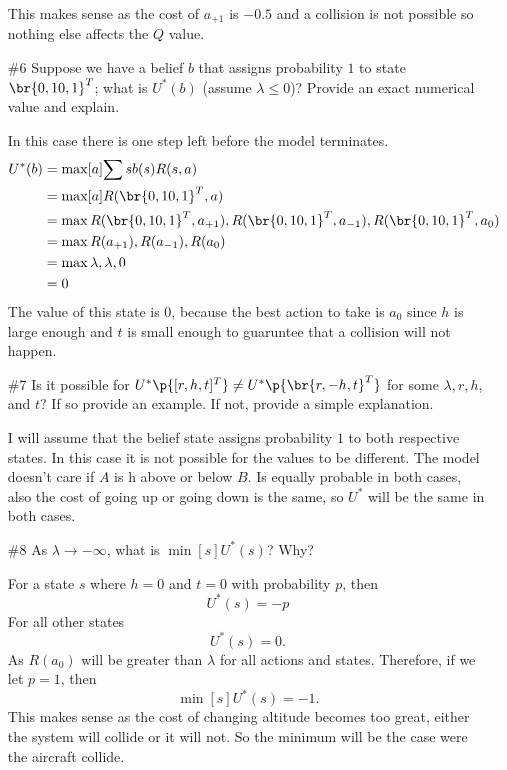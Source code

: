 \documentclass[12pt, oneside]{article}
\begin{document}
\begin{enumerate}
    This makes sense as the cost of $a_{+1}$ is $-0.5$ and a collision is not
    possible so nothing else affects the $Q$ value.

  \item[\#6]
    Suppose we have a belief $b$ that assigns probability $1$ to state
    $\br{0, 10, 1}^T$; what is $U^*(b)$ (assume $\lambda \le 0$)?
    Provide an exact numerical value and explain.

    In this case there is one step left before the model terminates.
    \begin{align*}
      U^*(b) &= \max[a]{\sum{s}{}{b(s)R(s, a)}} \\
      &= \max[a]{R(\br{0, 10, 1}^T, a)} \\
      &= \max{R(\br{0, 10, 1}^T, a_{+1}),R(\br{0, 10, 1}^T, a_{-1}), R(\br{0, 10, 1}^T, a_{0})} \\
      &= \max{R(a_{+1}),R(a_{-1}), R(a_{0})} \\
      &= \max{\lambda,\lambda, 0} \\
      &= 0 \\
    \end{align*}
    The value of this state is $0$, because the best action to take is $a_0$
    since $h$ is large enough and $t$ is small enough to guaruntee that a
    collision will not happen.



  \item[\#7]
    Is it possible for $U^*\p{[r, h, t]^T} \neq U^*\p{\br{r, -h, t}^T}$ for some
    $\lambda, r, h$, and $t$?
    If so provide an example.
    If not, provide a simple explanation.

    I will assume that the belief state assigns probability $1$ to both
    respective states.
    In this case it is not possible for the values to be different.
    The model doesn't care if $A$ is h above or below $B$.
    Is equally probable in both cases, also the cost of going up or going down
    is the same, so $U^*$ will be the same in both cases.

  \item[\#8]
    As $\lambda \to -\infty$, what is $\min[s]{U^*(s)}$?
    Why?

    For a state $s$ where $h = 0$ and $t = 0$ with probability $p$, then
    \[
      U^*(s) = -p
    \]
    For all other states
    \[
      U^*(s) = 0.
    \]
    As $R(a_0)$ will be greater than $\lambda$ for all actions and states.
    Therefore, if we let $p = 1$, then
    \[
      \min[s]{U^*(s)} = -1.
    \]
    This makes sense as the cost of changing altitude becomes too great, either
    the system will collide or it will not.
    So the minimum will be the case were the aircraft collide.


\end{enumerate}
\end{document}
